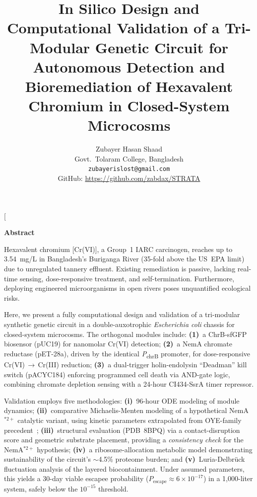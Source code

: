 \documentclass[10pt,twocolumn,letterpaper,
              colorlinks=true,
              linkcolor=blue!70!black,
              citecolor=blue!70!black,
              urlcolor=blue!70!black,
              pdfborder={0 0 0}]{article}
\title{\Large\bfseries
  In Silico Design and Computational Validation of a
  Tri-Modular Genetic Circuit for Autonomous Detection
  and Bioremediation of Hexavalent Chromium in
  Closed-System Microcosms}
\author{%
{\Large Zubayer Hasan Shaad}%
\hspace{0.08em}\raisebox{0.75ex}{\scalebox{0.82}{\orcidlink{0009-0002-2322-8553}}}

\vspace{0.8em}

{\normalsize Govt.\ Tolaram College, Bangladesh}

\vspace{0.35em}

{\small\texttt{zubayerislost@gmail.com}}

{\small
GitHub: \url{https://github.com/zabdax/STRATA}
}
\vspace{0.35em}
}
\begin{document}

\twocolumn[%
  \maketitle
  \vspace{-0.6em}
  \begin{center}
    \large\bfseries Abstract
  \end{center}
  \vspace{-0.3em}
  \noindent
  Hexavalent chromium {[Cr(VI)]}, a Group~1 IARC carcinogen, reaches up to
  3.54~mg/L in Bangladesh's Buriganga River (35-fold above the US~EPA 
  limit) due to unregulated tannery effluent. Existing remediation is passive, 
  lacking real-time sensing, dose-responsive treatment, and self-termination. 
  Furthermore, deploying engineered microorganisms in open rivers poses 
  unquantified ecological risks.

  \medskip\noindent
  Here, we present a fully computational design and validation of a
  tri-modular synthetic genetic circuit in a double-auxotrophic
  \textit{Escherichia coli} chassis for closed-system microcosms. The
  orthogonal modules include: \textbf{(1)}~a ChrB-sfGFP biosensor (pUC19)
  for nanomolar Cr(VI) detection; \textbf{(2)}~a NemA chromate reductase
  (pET-28a), driven by the identical \textit{P}\textsubscript{chrB} promoter, for
  dose-responsive Cr(VI)\,$\rightarrow$\,Cr(III) reduction; \textbf{(3)}~a 
  dual-trigger holin-endolysin ``Deadman'' kill switch (pACYC184) enforcing 
  programmed cell death via AND-gate logic, combining chromate depletion 
  sensing with a 24-hour CI434-SsrA timer repressor.

  \medskip\noindent
  Validation employs five methodologies: \textbf{(i)}~96-hour ODE modeling of
  module dynamics; \textbf{(ii)}~comparative Michaelis-Menten modeling of a
  hypothetical NemA$^{*2+}$ catalytic variant, using kinetic parameters
  extrapolated from OYE-family precedent~\cite{mowafy2010}; \textbf{(iii)}~structural
  evaluation (PDB~8BPQ) via a contact-disruption score and geometric
  substrate placement, providing a \textit{consistency check} for the NemA$^{*2+}$ 
  hypothesis; \textbf{(iv)}~a ribosome-allocation metabolic model demonstrating
  sustainability of the circuit's $\sim$4.5\% proteome burden; and
  \textbf{(v)}~Luria-Delbr\"{u}ck fluctuation analysis of the layered biocontainment.
  Under assumed parameters, this yields a 30-day viable escapee probability
  ($P_{\text{escape}} \approx 6 \times 10^{-17}$) in a 1{,}000-liter system,
  safely below the $10^{-15}$ threshold.
\end{document}
